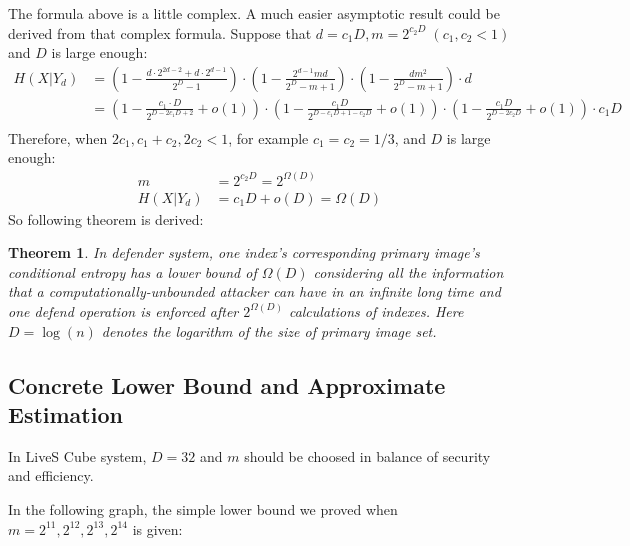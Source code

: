 \documentclass[10pt,a4paper]{article}
\newtheorem{mytheorem}{Theorem}
\begin{document}
		The formula above is a little complex. A much easier asymptotic result
		could be derived from that complex formula. Suppose that
		$d = c_1 D, m = 2^{c_2 D} \; (c_1, c_2 < 1)$ and $D$ is large enough:
		\begin{align*}
			H(X | Y_d) &= (1-\frac{d \cdot 2^{2d-2}+d \cdot 2^{d-1}}{2^D-1})
							\cdot (1-\frac{2^{d-1}m d}{2^D-m+1}) 
							\cdot (1-\frac{dm^2}{2^D-m+1}) \cdot d\\
						&= \left(1-\frac{c_1 \cdot D}{ 2^{D-2 c_1 D+2} } + o(1) \right)
							\cdot \left(1-\frac{c_1 D}{2^{D-c_1 D+1 - c_2 D}} + o(1) \right)	
							\cdot \left(1-\frac{c_1 D}{2^{D-2 c_2 D}} + o(1) \right) \cdot c_1 D\\
		\end{align*}
		Therefore, when $2c_1, c_1+c_2, 2c_2 < 1$, for example $c_1 = c_2 = 1/3$,
		and $D$ is large enough:
		\begin{align*}
			m &= 2^{c_2 D} = 2^{\Omega(D)}\\
			H(X | Y_d) &= c_1D+o(D) = \Omega(D)
		\end{align*}		
		So following theorem is derived:
		\begin{mytheorem}
			In defender system, one index's corresponding
			primary image's conditional entropy has a lower bound of $\Omega(D)$
			considering all the information
			that a computationally-unbounded attacker can
			have in an infinite long time and one defend operation
			is enforced after $2^{\Omega(D)}$ calculations of indexes.
			Here $D = \log(n)$ denotes the
			logarithm of the size of primary image set.
		\end{mytheorem}
		
	\subsection{Concrete Lower Bound and Approximate Estimation}
		In LiveS Cube system, $D = 32$ and $m$ should be
		choosed in balance of security and efficiency.
		
		In the following graph, the simple lower
		bound we proved when $m = 2^{11}, 2^{12}, 2^{13}, 2^{14}$ is given:
		
\end{document}
